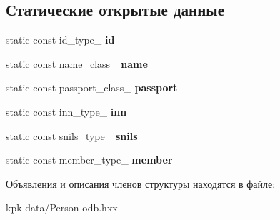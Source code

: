 \subsection*{Статические открытые данные}
\begin{DoxyCompactItemize}
\item 
static const id\+\_\+type\+\_\+ {\bfseries id}\hypertarget{structodb_1_1pointer__query__columns_3_01_1_1kpk_1_1data_1_1_person_00_01id__pgsql_00_01_a_01_4_ae234102ac1e994d6d3a8e2b270548918}{}\label{structodb_1_1pointer__query__columns_3_01_1_1kpk_1_1data_1_1_person_00_01id__pgsql_00_01_a_01_4_ae234102ac1e994d6d3a8e2b270548918}

\item 
static const name\+\_\+class\+\_\+ {\bfseries name}\hypertarget{structodb_1_1pointer__query__columns_3_01_1_1kpk_1_1data_1_1_person_00_01id__pgsql_00_01_a_01_4_a18131cab6b87651f60ccf8742922aea3}{}\label{structodb_1_1pointer__query__columns_3_01_1_1kpk_1_1data_1_1_person_00_01id__pgsql_00_01_a_01_4_a18131cab6b87651f60ccf8742922aea3}

\item 
static const passport\+\_\+class\+\_\+ {\bfseries passport}\hypertarget{structodb_1_1pointer__query__columns_3_01_1_1kpk_1_1data_1_1_person_00_01id__pgsql_00_01_a_01_4_a51bbb87ff8a63d787d1e45aa7bcb548e}{}\label{structodb_1_1pointer__query__columns_3_01_1_1kpk_1_1data_1_1_person_00_01id__pgsql_00_01_a_01_4_a51bbb87ff8a63d787d1e45aa7bcb548e}

\item 
static const inn\+\_\+type\+\_\+ {\bfseries inn}\hypertarget{structodb_1_1pointer__query__columns_3_01_1_1kpk_1_1data_1_1_person_00_01id__pgsql_00_01_a_01_4_af5f8f81d95f07425d8df461f58064c2d}{}\label{structodb_1_1pointer__query__columns_3_01_1_1kpk_1_1data_1_1_person_00_01id__pgsql_00_01_a_01_4_af5f8f81d95f07425d8df461f58064c2d}

\item 
static const snils\+\_\+type\+\_\+ {\bfseries snils}\hypertarget{structodb_1_1pointer__query__columns_3_01_1_1kpk_1_1data_1_1_person_00_01id__pgsql_00_01_a_01_4_a645e517bd6acddb68d3c2d6827437f88}{}\label{structodb_1_1pointer__query__columns_3_01_1_1kpk_1_1data_1_1_person_00_01id__pgsql_00_01_a_01_4_a645e517bd6acddb68d3c2d6827437f88}

\item 
static const member\+\_\+type\+\_\+ {\bfseries member}\hypertarget{structodb_1_1pointer__query__columns_3_01_1_1kpk_1_1data_1_1_person_00_01id__pgsql_00_01_a_01_4_aefce5006243c53495c8616e8a9648b75}{}\label{structodb_1_1pointer__query__columns_3_01_1_1kpk_1_1data_1_1_person_00_01id__pgsql_00_01_a_01_4_aefce5006243c53495c8616e8a9648b75}

\end{DoxyCompactItemize}


Объявления и описания членов структуры находятся в файле\+:\begin{DoxyCompactItemize}
\item 
kpk-\/data/Person-\/odb.\+hxx\end{DoxyCompactItemize}
